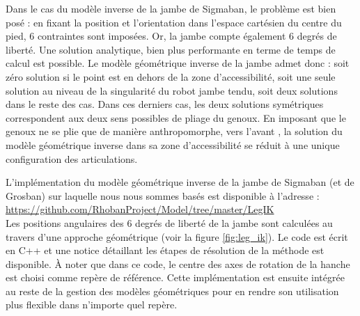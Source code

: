 Dans le cas du modèle inverse de la jambe de Sigmaban, le problème est
bien posé : en fixant la position et l'orientation dans l'espace cartésien 
du centre du pied, $6$ contraintes sont imposées. Or, la jambe compte 
également $6$ degrés de liberté. 
Une solution analytique, bien plus performante en terme de temps de calcul est possible.
Le modèle géométrique inverse de la jambe admet donc : 
soit zéro solution si le point est en dehors de la zone d'accessibilité,
soit une seule solution au niveau de la singularité du robot jambe tendu, 
soit deux solutions dans le reste des cas.
Dans ces derniers cas, les deux solutions symétriques correspondent 
aux deux sens possibles de \og pliage \fg du genoux.
En imposant que le genoux ne se plie que de manière anthropomorphe, 
\og vers l'avant \fg, la solution du modèle géométrique inverse dans
sa zone d'accessibilité se réduit à une unique configuration des articulations.

L'implémentation du modèle géométrique inverse de la jambe de Sigmaban
(et de Grosban) sur laquelle nous nous sommes basés est disponible à l'adresse :\\
\url{https://github.com/RhobanProject/Model/tree/master/LegIK}\\
Les positions angulaires des $6$ degrés de liberté de la jambe 
sont calculées au travers d'une approche géométrique (voir la figure \ref{fig:leg_ik}).
Le code est écrit en C++ et une notice détaillant les étapes de résolution 
de la méthode est disponible.
À noter que dans ce code, le centre des axes de rotation de la hanche
est choisi comme repère de référence.
Cette implémentation est ensuite intégrée au reste de la gestion
des modèles géométriques pour en rendre son utilisation 
plus flexible dans n'importe quel repère.\\

